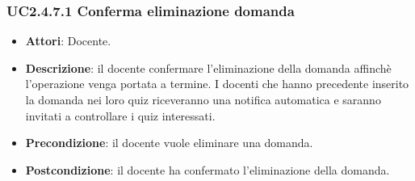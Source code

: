 \subsubsection{UC2.4.7.1 Conferma eliminazione domanda}
\begin{itemize}
\item \textbf{Attori}: Docente.
\item \textbf{Descrizione}: il docente confermare l'eliminazione della domanda affinchè l'operazione venga portata a termine. I docenti che hanno precedente inserito la domanda nei loro quiz riceveranno una notifica automatica e saranno invitati a controllare i quiz interessati.
\item \textbf{Precondizione}: il docente vuole eliminare una domanda.
\item \textbf{Postcondizione}: il docente ha confermato l'eliminazione della domanda.
\end{itemize}
